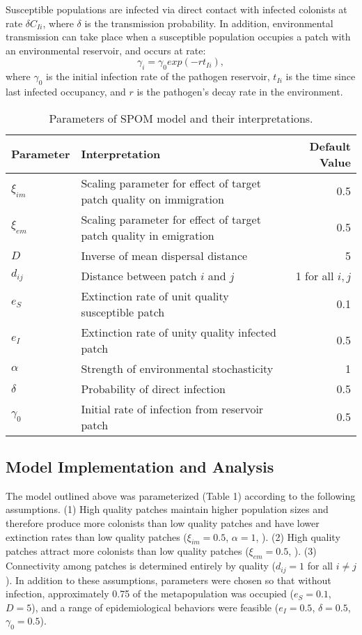 \documentclass{svjour3}
\begin{document}
Susceptible populations are infected via direct contact with infected colonists at rate $\delta C_{Ii}$, where $\delta$ is the transmission probability.  In addition, environmental transmission can take place when a susceptible population occupies a patch with an environmental reservoir, and occurs at rate:
\begin{equation}
\gamma_i=\gamma_0exp(-rt_{Ii}),
\end{equation}
where $\gamma_0$ is the initial infection rate of the pathogen reservoir, $t_{Ii}$ is the time since last infected occupancy, and $r$ is the pathogen's decay rate in the environment.


\begin{table}[h!]
\label{parameters}      
\caption{Parameters of SPOM model and their interpretations.}
\begin{tabular}{l p{8.5cm} r}
Parameter & Interpretation &  Default Value\\
\hline
$\xi_{im}$ & Scaling parameter for effect of target patch quality on immigration & 0.5\\
$\xi_{em}$ & Scaling parameter for effect of target patch quality in emigration & 0.5\\
$D$& Inverse of mean dispersal distance & 5\\
$d_{ij}$ & Distance between patch $i$ and $j$ & 1 for all $i,j$\\
\hline
$e_S$ & Extinction rate of unit quality susceptible patch & 0.1\\
$e_I$ & Extinction rate of unity quality infected patch & 0.5\\
$\alpha$ & Strength of environmental stochasticity & 1\\
\hline
$\delta$ & Probability of direct infection & 0.5\\
$\gamma_0$ & Initial rate of infection from reservoir patch & 0.5
\end{tabular}
\end{table}

\subsection{Model Implementation and Analysis}

The model outlined above was parameterized (Table 1) according to the following assumptions. (1) High quality patches maintain higher population sizes and therefore produce more colonists than low quality patches and have lower extinction rates than low quality patches ($\xi_{im}=0.5$, $\alpha=1$, \cite{Hanski2003}).  (2) High quality patches attract more colonists than low quality patches ($\xi_{em}=0.5$, \cite{Hanski2003}).  (3)  Connectivity among patches is determined entirely by quality ($d_{ij}=1$ for all $i \neq j$).  In addition to these assumptions, parameters were chosen so that without infection, approximately 0.75 of the metapopulation was occupied ($e_S = 0.1$, $D=5$), and a range of epidemiological behaviors were feasible ($e_I = 0.5$, $\delta = 0.5$, $\gamma_0 = 0.5$). 
\end{document}
